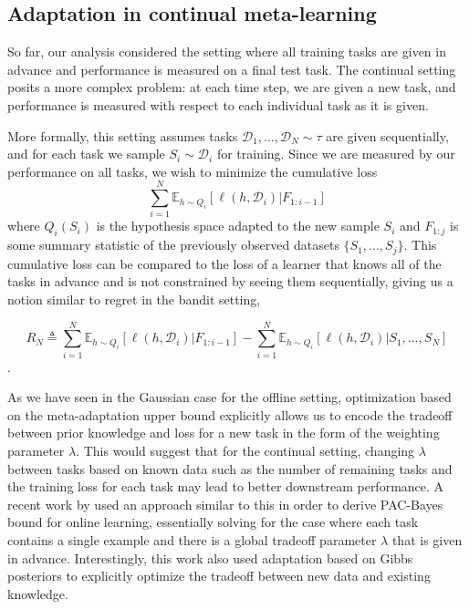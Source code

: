 \documentclass{article}
\theoremstyle{definition}
\newcommand{\Expect}[2]{\mathbb{E}_{#1}\left [#2 \right ]}
\begin{document}
\subsection{Adaptation in continual meta-learning}

So far, our analysis considered the setting where all training tasks are given in advance and performance is measured on a final test task. The continual setting posits a more complex problem: at each time step, we are given a new task, and performance is measured with respect to each individual task as it is given. 

More formally, this setting assumes tasks $\mathcal{D}_1,\ldots,\mathcal{D}_N\sim \tau$ are given sequentially, and for each task we sample $S_i\sim \mathcal{D}_i$ for training. Since we are measured by our performance on all tasks, we wish to minimize the cumulative loss
$$\sum_{i=1}^{N}\Expect{h\sim Q_i}{\ell(h, \mathcal{D}_i)| F_{1:i-1}}$$
where $Q_i(S_i)$ is the hypothesis space adapted to the new sample $S_i$ and $F_{1:j}$ is some summary statistic of the previously observed datasets $\{S_1,...,S_j\}$.
This cumulative loss can be compared to the loss of a learner that knows all of the tasks in advance and is not constrained by seeing them sequentially, giving us a notion similar to regret in the bandit setting,

$$R_N\triangleq \sum_{i=1}^{N}\Expect{h\sim Q_i}{\ell(h, \mathcal{D}_i)| F_{1:i-1}}-\sum_{i=1}^{N}\Expect{h\sim Q_i}{\ell(h,\mathcal{D}_i)|S_1,\ldots,S_N}$$.

As we have seen in the Gaussian case for the offline setting, optimization based on the meta-adaptation upper bound explicitly allows us to encode the tradeoff between prior knowledge and loss for a new 
task in the form of the weighting parameter $\lambda$.
This would suggest that for the continual setting, changing $\lambda$ between tasks based on known data such as the number of remaining tasks and the training loss for each task may lead to better downstream performance. 
A recent work by \citet{Haddouche2022} used an approach similar to this in order to derive PAC-Bayes bound for online learning, essentially solving for the case where each task contains a single example and there is a global tradeoff parameter $\lambda$ that is given in advance. Interestingly, this work also used adaptation based on Gibbs posteriors to explicitly optimize the tradeoff between new data and existing knowledge.
\end{document}
